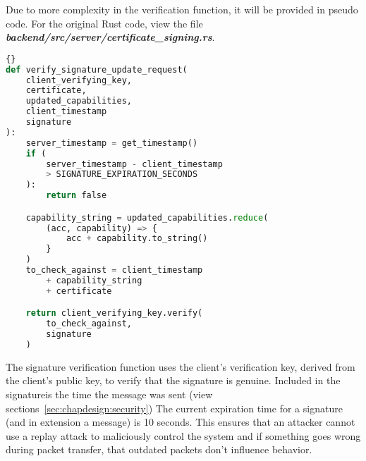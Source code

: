 Due to more complexity in the verification function, it will be provided in pseudo code. For the original Rust code, view the file \textit{\textbf{backend/src/server/certificate\_signing.rs}}. 
\begin{lstlisting}[language=Python, style=boxed, showstringspaces=false]{}
def verify_signature_update_request(
    client_verifying_key,
    certificate,
    updated_capabilities,
    client_timestamp
    signature
):
    server_timestamp = get_timestamp()
    if (
        server_timestamp - client_timestamp 
        > SIGNATURE_EXPIRATION_SECONDS
    ):
        return false

    capability_string = updated_capabilities.reduce(
        (acc, capability) => {
            acc + capability.to_string()
        }
    )
    to_check_against = client_timestamp 
        + capability_string
        + certificate

    return client_verifying_key.verify(
        to_check_against,
        signature
    )
\end{lstlisting}
The signature verification function uses the client's verification key, derived from the client's public key, to verify that the signature is genuine. Included in the signatureis the time the message was sent (view sections~\ref{sec:chapdesign:security}) The current expiration time for a signature (and in extension a message) is 10 seconds. This ensures that an attacker cannot use a replay attack to maliciously control the system and if something goes wrong during packet transfer, that outdated packets don't influence behavior. 

